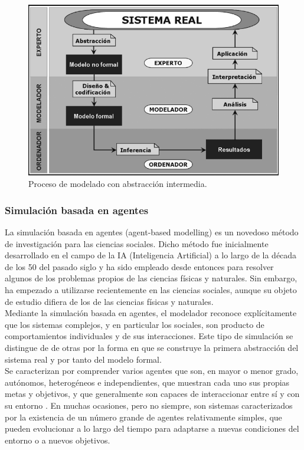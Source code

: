 \begin{figure}[!h]
	\centering
	\includegraphics[scale=0.5]{Images/esquema_modelado_cientifico_con_abstraccion.png}
	\caption{Proceso de modelado con abstracción intermedia. \parencite{izquierdo2008modelado}}
	\label{fig:img_2}
\end{figure}

\subsubsection{Simulación basada en agentes}

La simulación basada en agentes (agent-based modelling) es un novedoso método de investigación para las ciencias sociales. Dicho método fue inicialmente desarrollado en el campo de la IA (Inteligencia Artificial) a lo largo de la década de los 50 del pasado siglo y ha sido empleado desde entonces para resolver algunos de los problemas propios de las ciencias físicas y naturales. Sin embargo, ha empezado a utilizarse recientemente en las ciencias sociales, aunque su objeto de estudio difiera de los de las ciencias físicas y naturales. \parencite{garcia2016simulacion}\\

Mediante la simulación basada en agentes, el modelador reconoce
explícitamente que los sistemas complejos, y en particular los sociales, son
producto de comportamientos individuales y de sus interacciones. \parencite{izquierdo2008modelado}
Este tipo de simulación se distingue de de otras por la forma en que se construye la primera abstracción del sistema real y por tanto del modelo formal.\\

Se caracterizan por comprender varios agentes que son, en mayor o menor grado, autónomos, heterogéneos e independientes, que muestran cada uno sus propias metas y objetivos, y que generalmente son capaces de interaccionar entre sí y con su entorno \parencite{torsun1995foundations}. En muchas ocasiones, pero no siempre, son sistemas caracterizados por la existencia de un número grande de agentes relativamente simples, que pueden evolucionar a lo largo del tiempo para adaptarse a nuevas condiciones del entorno o a nuevos objetivos. \parencite{izquierdo2008modelado}

